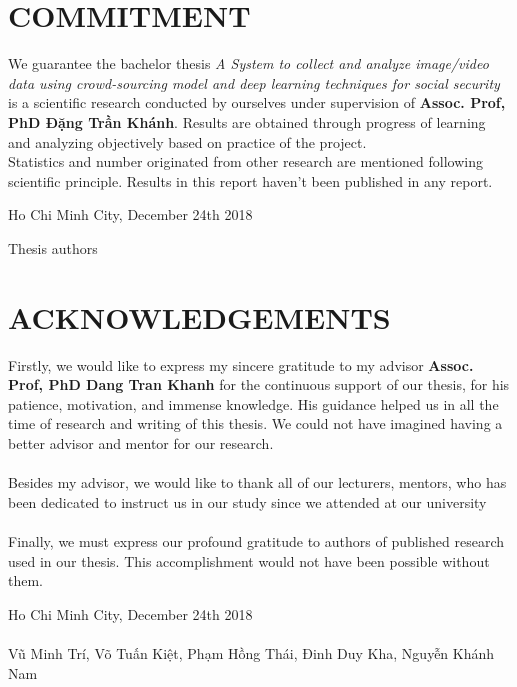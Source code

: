 \documentclass[a4paper,12pt,oneside]{ThesisStyle}
\begin{document}


\dominitoc


\cleardoublepage

\chapter*{COMMITMENT}
We guarantee the bachelor thesis \textit{A System to collect and analyze image/video data using crowd-sourcing model and deep learning techniques for social security} is a scientific research conducted by ourselves under supervision of \textbf{Assoc. Prof, PhD Đặng Trần Khánh}. Results are obtained through progress of learning and analyzing objectively based on practice of the project. 
\\
Statistics and number originated from other research are mentioned following scientific principle. Results in this report haven't been published in any report.

\begin{flushright}
Ho Chi Minh City, December 24th 2018
\end{flushright}
\hspace{11cm} Thesis authors \\
\vspace{3cm}

\cleardoublepage

\chapter*{ACKNOWLEDGEMENTS}
Firstly, we would like to express my sincere gratitude to my advisor \textbf{Assoc. Prof, PhD Dang Tran Khanh} for the continuous support of our thesis, for his patience, motivation, and immense knowledge. His guidance helped us in all the time of research and writing of this thesis. We could not have imagined having a better advisor and mentor for our research.
\\
\\
Besides my advisor, we would like to thank all of our lecturers, mentors, who has been dedicated to instruct us in our study since we attended at our university
\\
\\
Finally, we must express our profound gratitude to authors of published research used in our thesis. This accomplishment would not have been possible without them.

\begin{flushright}
Ho Chi Minh City, December 24th 2018 \\
\hfill \\
Vũ Minh Trí, Võ Tuấn Kiệt, Phạm Hồng Thái, Đinh Duy Kha, Nguyễn Khánh Nam
\end{flushright}
\end{document}
